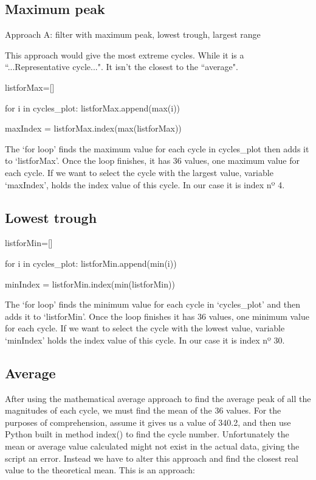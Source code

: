 \subsection{Maximum peak}
Approach A: filter with maximum peak, lowest trough, largest range 

This approach would give the most extreme cycles. While it is a ``...Representative cycle...". It isn't the closest to the ``average".

\begin{python}
listforMax=[]

for i in cycles_plot:
    listforMax.append(max(i))    
    
maxIndex = listforMax.index(max(listforMax))

\end{python}

The `for loop' finds the maximum value for each cycle in cycles\_plot then adds it to `listforMax'. Once the loop finishes, it has 36 values, one maximum value for each cycle. If we want to select the cycle with the largest value, variable `maxIndex', holds the index value of this cycle. In our case it is index nº 4.

\subsection{Lowest trough}

\begin{python}
listforMin=[]

for i in cycles_plot:
    listforMin.append(min(i))
    
minIndex = listforMin.index(min(listforMin))

\end{python}

The `for loop' finds the minimum value for each cycle in `cycles\_plot' and then adds it to `listforMin'. Once the loop finishes it has 36 values, one minimum value for each cycle. If we want to select the cycle with the lowest value, variable `minIndex' holds the index value of this cycle. In our case it is index nº 30.

\subsection{Average}
After using the mathematical average approach to find the average peak of all the magnitudes of each cycle, we must find the mean of the 36 values. For the purposes of comprehension, assume it gives us a value of 340.2, and then use Python built in method index() to find the cycle number. Unfortunately the mean or average value calculated might not exist in the actual data, giving the script an error. Instead we have to alter this approach and find the closest real value to the theoretical mean. This is an approach: 

